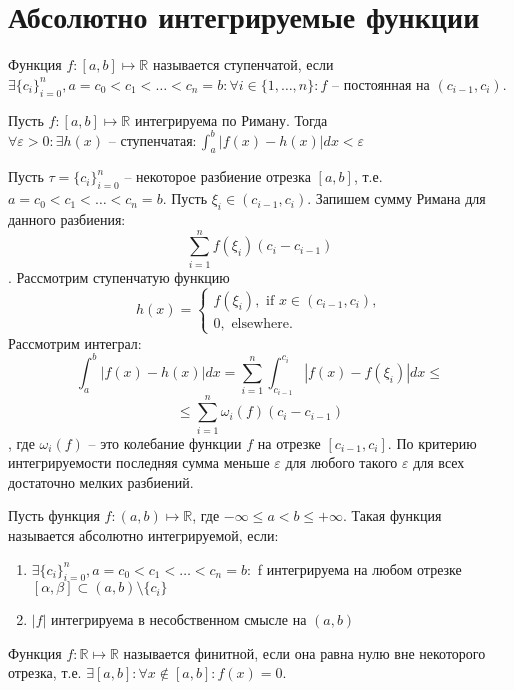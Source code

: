 \documentclass[document.tex]{subfiles}
\begin{document}
\section{Абсолютно интегрируемые функции}
\begin{definition}
Функция $f: [a, b] \mapsto \mathbb{R}$ называется ступенчатой, если $\exists \{c_i\}_{i=0}^n,
a = c_0 < c_1 < \ldots < c_n = b: \forall i \in \{1, \ldots, n\}: f\text{ -- постоянная на }(c_{i-1}, c_i)$.
\end{definition}

\begin{theorem}
Пусть $f : [a, b] \mapsto \mathbb{R}$ интегрируема по Риману. Тогда $\forall \varepsilon > 0: \exists h(x)\text{ -- ступенчатая} : \int_a^b|f(x)-h(x)|dx < \varepsilon$
\end{theorem}
\begin{Proof}
Пусть $\tau = \{c_i\}_{i=0}^n$ -- некоторое разбиение отрезка $[a, b]$, т.е. $a = c_0 < c_1 < \ldots < c_n = b$. Пусть $\xi_i \in (c_{i - 1}, c_i)$. Запишем сумму Римана для данного разбиения:
$$\sum_{i=1}^n f(\xi_i)(c_i - c_{i-1})$$. Рассмотрим ступенчатую функцию
 $$h(x) = \begin{cases}
 	f(\xi_i),\text{ if } x \in (c_{i-1}, c_i),\\
 	0, \text{ elsewhere}.
\end{cases}$$
Рассмотрим интеграл:
$$\int_a^b|f(x)-h(x)|dx = \sum_{i=1}^n\int_{c_{i-1}}^{c_i}|f(x) - f(\xi_i)|dx \leq$$
$$\leq \sum_{i=1}^n\omega_i(f)(c_i - c_{i-1})$$,
где $\omega_i(f)$ -- это колебание функции $f$ на отрезке $[c_{i-1}, c_i]$. По критерию интегрируемости последняя сумма меньше $\varepsilon$ для любого такого $\varepsilon$ для всех достаточно мелких разбиений.
\end{Proof}

\begin{definition}
Пусть функция $f: (a, b) \mapsto \mathbb{R}$, где $-\infty \leq a < b \leq +\infty$. Такая функция называется абсолютно интегрируемой, если:
\begin{enumerate}
\item $\exists \{c_i\}_{i=0}^n, a = c_0 < c_1 < \ldots < c_n = b:$ f интегрируема на любом отрезке $[\alpha, \beta] \subset (a, b) \setminus \{c_i\}$
\item $|f|$ интегрируема в несобственном смысле на $(a, b)$
\end{enumerate}
\end{definition}

\begin{definition}
Функция $f: \mathbb{R} \mapsto \mathbb{R}$ называется финитной, если она равна нулю вне некоторого отрезка, т.е. $\exists [a, b] : \forall x \not \in [a, b] : f(x) = 0$.
\end{definition}
\end{document}
